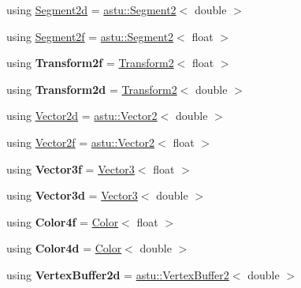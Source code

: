 \begin{DoxyCompactItemize}
\item 
using \hyperlink{namespaceastu_a4a6a4a3ba71e40694ac08f39fa00a3bc}{Segment2d} = \hyperlink{classastu_1_1Segment2}{astu\+::\+Segment2}$<$ double $>$
\item 
using \hyperlink{namespaceastu_ab93de73c36660369f18786b88125e902}{Segment2f} = \hyperlink{classastu_1_1Segment2}{astu\+::\+Segment2}$<$ float $>$
\item 
\mbox{\label{namespaceastu_ac67b5e9d27308a01ea8190ecb15e08fa}} 
using {\bfseries Transform2f} = \hyperlink{classastu_1_1Transform2}{Transform2}$<$ float $>$
\item 
\mbox{\label{namespaceastu_a65979825a2f2857cba98d2d54a1df913}} 
using {\bfseries Transform2d} = \hyperlink{classastu_1_1Transform2}{Transform2}$<$ double $>$
\item 
using \hyperlink{namespaceastu_ac96b7e49cebcbe77f063023a07785e92}{Vector2d} = \hyperlink{classastu_1_1Vector2}{astu\+::\+Vector2}$<$ double $>$
\item 
using \hyperlink{namespaceastu_ad97a0a61e8cfa5a6a84a72d93eea2491}{Vector2f} = \hyperlink{classastu_1_1Vector2}{astu\+::\+Vector2}$<$ float $>$
\item 
\mbox{\label{namespaceastu_a98ec5173396beee8b458e119ef41dae4}} 
using {\bfseries Vector3f} = \hyperlink{classastu_1_1Vector3}{Vector3}$<$ float $>$
\item 
\mbox{\label{namespaceastu_a5fe49d8ec52a85eb2722eaf4e8143c19}} 
using {\bfseries Vector3d} = \hyperlink{classastu_1_1Vector3}{Vector3}$<$ double $>$
\item 
\mbox{\label{namespaceastu_a7763d13471ef3249e3d179295741d2c5}} 
using {\bfseries Color4f} = \hyperlink{classastu_1_1Color}{Color}$<$ float $>$
\item 
\mbox{\label{namespaceastu_a339c9ba186fbbc39a004b758b070db9a}} 
using {\bfseries Color4d} = \hyperlink{classastu_1_1Color}{Color}$<$ double $>$
\item 
\mbox{\label{namespaceastu_a0984042ea57451b25cc703c049481e98}} 
using {\bfseries Vertex\+Buffer2d} = \hyperlink{classastu_1_1VertexBuffer2}{astu\+::\+Vertex\+Buffer2}$<$ double $>$

\end{DoxyCompactItemize}
